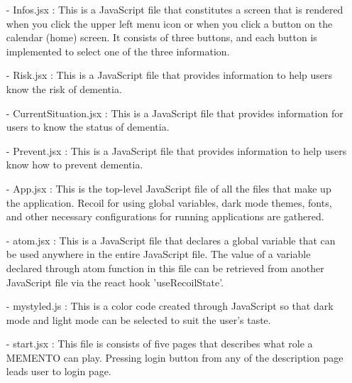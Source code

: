\documentclass[conference]{IEEEtran}
\begin{document}
\begin{enumerate}
        \item[-] Infos.jsx : This is a JavaScript file that constitutes a screen that is rendered when you click the upper left menu icon or when you click a button on the calendar (home) screen. It consists of three buttons, and each button is implemented to select one of the three information.\\
        \item[-] Risk.jsx : This is a JavaScript file that provides information to help users know the risk of dementia.\\
        \item[-] CurrentSituation.jsx : This is a JavaScript file that provides information for users to know the status of dementia.\\
        \item [-] Prevent.jsx : This is a JavaScript file that provides information to help users know how to prevent dementia.\\
        \item [-] App.jsx : This is the top-level JavaScript file of all the files that make up the application. Recoil for using global variables, dark mode themes, fonts, and other necessary configurations for running applications are gathered.\\
        \item [-] atom.jsx : This is a JavaScript file that declares a global variable that can be used anywhere in the entire JavaScript file. The value of a variable declared through atom function in this file can be retrieved from another JavaScript file via the react hook 'useRecoilState'.\\
        \item [-] mystyled.js : This is a color code created through JavaScript so that dark mode and light mode can be selected to suit the user's taste. \\
        \item [-] start.jsx : This file is consists of five pages that describes what role a MEMENTO can play. Pressing login button from any of the description page leads user to login page.
\end{enumerate}
\end{document}
